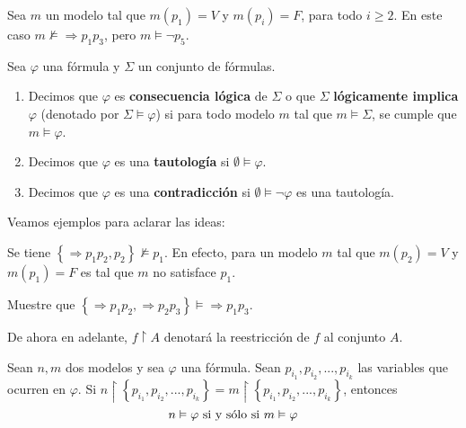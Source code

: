 \documentclass[12pt]{report}
\newcounter{it}
\theoremstyle{largebreak}
\begin{document}
    \begin{exa}
        Sea $m$ un modelo tal que $m(p_1)=V$ y $m(p_i)=F$, para todo $i\geq2$. En este caso $m\nvDash \Rightarrow p_1p_3$, pero $m\vDash \neg p_5$.
    \end{exa}

    \begin{mydef}
        Sea $\varphi$ una fórmula y $\Sigma$ un conjunto de fórmulas.
        \begin{enumerate}
            \item Decimos que $\varphi$ es \textbf{consecuencia lógica} de $\Sigma$ o que $\Sigma$ \textbf{lógicamente implica} $\varphi$ (denotado por $\Sigma\vDash\varphi$) si para todo modelo $m$ tal que $m\vDash\Sigma$, se cumple que $m\vDash\varphi$.
            \item Decimos que $\varphi$ es una \textbf{tautología} si $\emptyset\vDash\varphi$.
            \item Decimos que $\varphi$ es una \textbf{contradicción} si $\emptyset\vDash\neg\varphi$ es una tautología.
        \end{enumerate}
    \end{mydef}

    Veamos ejemplos para aclarar las ideas:

    \begin{exa}
        Se tiene $\left\{\Rightarrow p_1p_2,p_2 \right\}\nvDash p_1$. En efecto, para un modelo $m$ tal que $m(p_2)=V$ y $m(p_1)=F$ es tal que $m$ no satisface $p_1$.
    \end{exa}

    \begin{exa}
        Muestre que $\left\{\Rightarrow p_1p_2,\Rightarrow p_2p_3 \right\}\vDash\Rightarrow p_1p_3$.
    \end{exa}

    \newcommand{\rest}{\ensuremath{\upharpoonright}}

    \begin{obs}
        De ahora en adelante, $f\rest A$ denotará la reestricción de $f$ al conjunto $A$.
    \end{obs}

    \begin{lema}
        Sean $n,m$ dos modelos y sea $\varphi$ una fórmula. Sean $p_{ i_1},p_{ i_2},...,p_{ i_k}$ las variables que ocurren en $\varphi$. Si $n\rest\left\{p_{ i_1},p_{ i_2},...,p_{ i_k}\right\}=m\rest\left\{p_{ i_1},p_{ i_2},...,p_{ i_k}\right\}$, entonces
        \begin{equation*}
            n\vDash \varphi\textup{ si y sólo si } m\vDash\varphi
        \end{equation*}
    \end{lema}
\end{document}
